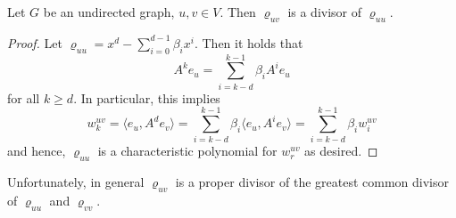 \documentclass[a4paper,12pt]{article}
\begin{document}
\begin{cor}
Let $G$ be an undirected graph, $u,v\in V$. Then $\varrho_{uv}$ is a divisor of $\varrho_{uu}$.
\end{cor}

\begin{proof}
Let $\varrho_{uu} = x^d - \sum_{i=0}^{d-1} \beta_ix^i$. Then it holds that
$$
A^ke_u = \sum_{i=k-d}^{k-1}\beta_iA^ie_u
$$
for all $k \ge d$. In particular, this implies
$$
w_k^{uv} = \langle e_u, A^de_v\rangle = \sum_{i=k-d}^{k-1}\beta_i\langle e_u, A^ie_v\rangle = \sum_{i=k-d}^{k-1}\beta_iw_i^{uv}
$$
and hence, $\varrho_{uu}$ is a characteristic polynomial for $w_r^{uv}$ as desired.
\end{proof}

Unfortunately, in general $\varrho_{uv}$ is a proper divisor of the greatest common divisor of $\varrho_{uu}$ and $\varrho_{vv}$.


\end{document}
